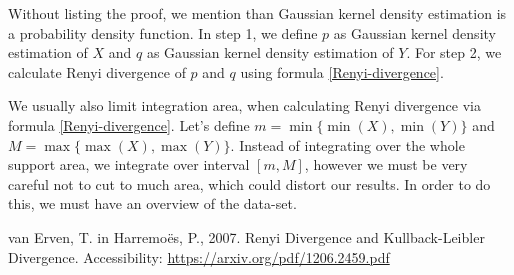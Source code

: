 \documentclass[a4paper, 12pt]{article}
\theoremstyle{definition}
\begin{document}
Without listing the proof, we mention than Gaussian kernel density estimation is a probability density function. In step 1, we define $p$ as Gaussian kernel density estimation of $X$ and $q$ as Gaussian kernel density estimation of $Y$. For step 2, we calculate Renyi divergence of $p$ and $q$ using formula \eqref{Renyi-divergence}.

We usually also limit integration area, when calculating Renyi divergence via formula \eqref{Renyi-divergence}. Let's define $m = \min\{\min(X), \min(Y)\}$ and $M = \max\{\max(X), \max(Y)\}$. Instead of integrating over the whole support area, we integrate over interval $[m, M]$, however we must be very careful not to cut to much area, which could distort our results. In order to do this, we must have an overview of the data-set.

\newpage


% 

\begin{thebibliography}{9}

van Erven, T. in Harremoës, P., 2007. Renyi Divergence and Kullback-Leibler Divergence. Accessibility: 
\url{https://arxiv.org/pdf/1206.2459.pdf} 

\end{thebibliography}
\end{document}
